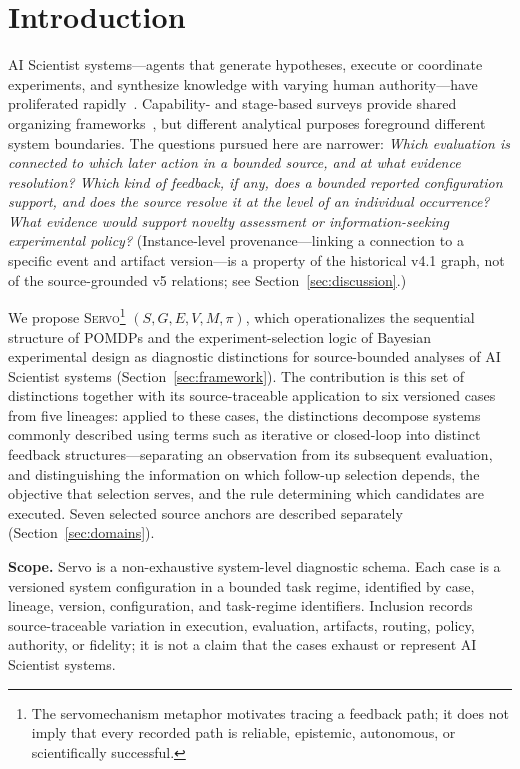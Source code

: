 \documentclass{article}
\newcommand{\sgmvpi}{$(S, G, E, V, M, \pi)$}
\newcommand{\framework}{\textsc{Servo}}
\begin{document}
\section{Introduction}

AI Scientist systems---agents that generate hypotheses, execute or coordinate experiments, and synthesize knowledge with varying human authority---have proliferated rapidly~\citep{boiko2023emergent,lu2024aiscientist,lu2026aiscientist,google2026aletheia,liu2026lasthuman}. Capability- and stage-based surveys provide shared organizing frameworks~\citep{wei2025agenticscience,tie2025survey}, but different analytical purposes foreground different system boundaries. The questions pursued here are narrower: \textit{Which evaluation is connected to which later action in a bounded source, and at what evidence resolution? Which kind of feedback, if any, does a bounded reported configuration support, and does the source resolve it at the level of an individual occurrence? What evidence would support novelty assessment or information-seeking experimental policy?} (Instance-level provenance---linking a connection to a specific event and artifact version---is a property of the historical v4.1 graph, not of the source-grounded v5 relations; see Section~\ref{sec:discussion}.)

We propose \framework{}\footnote{The servomechanism metaphor motivates tracing a feedback path; it does not imply that every recorded path is reliable, epistemic, autonomous, or scientifically successful.} \sgmvpi{}, which operationalizes the sequential structure of POMDPs and the experiment-selection logic of Bayesian experimental design as diagnostic distinctions for source-bounded analyses of AI Scientist systems (Section~\ref{sec:framework}). The contribution is this set of distinctions together with its source-traceable application to six versioned cases from five lineages: applied to these cases, the distinctions decompose systems commonly described using terms such as iterative or closed-loop into distinct feedback structures---separating an observation from its subsequent evaluation, and distinguishing the information on which follow-up selection depends, the objective that selection serves, and the rule determining which candidates are executed. Seven selected source anchors are described separately (Section~\ref{sec:domains}).

\noindent\textbf{Scope.} Servo is a non-exhaustive system-level diagnostic schema. Each case is a versioned system configuration in a bounded task regime, identified by case, lineage, version, configuration, and task-regime identifiers. Inclusion records source-traceable variation in execution, evaluation, artifacts, routing, policy, authority, or fidelity; it is not a claim that the cases exhaust or represent AI Scientist systems.
\end{document}
